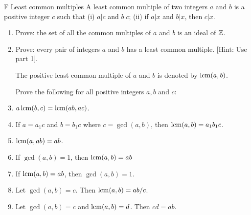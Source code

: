 \begin{exercise}{F Least common multiples}
A least common multiple of two integers $a$ and $b$ is a positive integer $c$ such that (i) $a\vert c$ and $b\vert c$; (ii) if $a\vert x$ and $b\vert x$, then $c\vert x$.
\begin{enumerate}
    \item Prove: the set of all the common multiples of $a$ and $b$ is an ideal of $\mathbb{Z}$.
    \item Prove: every pair of integers $a$ and $b$ has a least common multiple. [Hint: Use part 1].

    The positive least common multiple of $a$ and $b$ is denoted by $\operatorname*{lcm}(a,b)$.

    Prove the following for all positive integers $a,b$ and $c$:
    \item $a\operatorname*{lcm}(b,c)=\operatorname*{lcm}(ab,ac)$.
    \item If $a=a_{1}c$ and $b=b_{1}c$ where $c=\gcd(a,b)$, then $\operatorname*{lcm}(a,b)=a_{1}b_{1}c$.
    \item $\operatorname*{lcm}(a,ab)=ab$.
    \item If $\gcd(a,b)=1$, then $\operatorname*{lcm}(a,b)=ab$
    \item If $\operatorname*{lcm}(a,b)=ab$, then $\gcd(a,b)=1$.
    \item Let $\gcd(a,b)=c$. Then $\operatorname*{lcm}(a,b)=ab/c$.
    \item Let $\gcd(a,b)=c$ and $\operatorname*{lcm}(a,b)=d$. Then $cd=ab$.
\end{enumerate}
\end{exercise}
